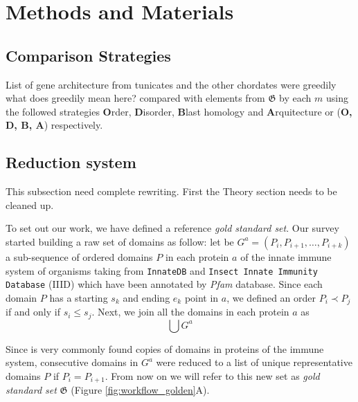 \documentclass[11pt]{article}
\newcommand{\TODO}[1]{\begingroup\color{red}#1\endgroup}
\begin{document}
\section*{Methods and Materials}

\subsection*{Comparison Strategies} \label{comparison}

List of gene architecture from tunicates and the other chordates were
greedily \TODO{what does greedily mean here?} compared with elements from
$\boldsymbol{\mathfrak{G}}$ by each $m$ using the followed strategies
\textbf{O}rder, \textbf{D}isorder, \textbf{B}last homology and
\textbf{A}rquitecture or (\textbf{O, D, B, A}) respectively.

\subsection*{Reduction system} \label{reduction}

\TODO{This subsection need complete rewriting. First the Theory section
  needs to be cleaned up.} 

To set out our work, we have defined a reference \textsl{gold standard set}. 
Our survey started building a raw set of domains as follow: let be $G^{a} = 
(P_i,P_{i+1},\ldots,P_{i+k})$ a sub-sequence of ordered domains $P$ in each 
protein $a$ of the innate immune system of organisms taking from 
\texttt{InnateDB} and \texttt{Insect Innate Immunity Database} (IIID) which have 
been annotated by \textit{Pfam} database. Since each domain $P$ has a starting 
$s_k$ and ending $e_k$ point in $a$, we defined an order $P_i \prec P_j$ if and 
only if $s_i \le s_j$. Next, we join all the domains in each protein $a$ as 
\[\bigcup G^{a}\]

Since is very commonly found copies of domains in proteins of the immune 
system, consecutive domains in $G^{a}$ were reduced to a list of unique 
representative domains $P$ if $P_i = P_{i+1}$. From now on we will refer to this 
new set as \textsl{gold standard set} $\boldsymbol{\mathfrak{G}}$ (Figure 
\ref{fig:workflow_golden}A).
  

  
\end{document}
